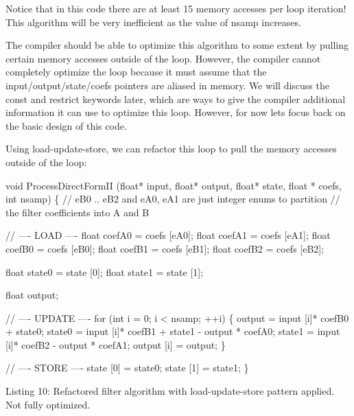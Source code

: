 Notice that in this code there are at least 15 memory accesses per loop iteration! This algorithm will be very inefficient as the value of {\ttfamily nsamp} increases.

The compiler should be able to optimize this algorithm to some extent by pulling certain memory accesses outside of the loop. However, the compiler cannot completely optimize the loop because it must assume that the input/output/state/coefs pointers are aliased in memory. We will discuss the {\ttfamily const} and {\ttfamily restrict} keywords later, which are ways to give the compiler additional information it can use to optimize this loop. However, for now let\textquotesingle{}s focus back on the basic design of this code.

Using load-\/update-\/store, we can refactor this loop to pull the memory accesses outside of the loop\+:


\begin{DoxyCode}
\textcolor{keywordtype}{void}
ProcessDirectFormII (\textcolor{keywordtype}{float}* input, \textcolor{keywordtype}{float}* output, \textcolor{keywordtype}{float}* state, \textcolor{keywordtype}{float} *
    coefs, \textcolor{keywordtype}{int} nsamp)
\{
    \textcolor{comment}{// eB0 .. eB2 and eA0, eA1 are just integer enums to partition}
    \textcolor{comment}{// the filter coefficients into A and B}

    \textcolor{comment}{// ---- LOAD ----}
    \textcolor{keywordtype}{float} coefA0 = coefs [eA0];
    \textcolor{keywordtype}{float} coefA1 = coefs [eA1];
    \textcolor{keywordtype}{float} coefB0 = coefs [eB0];
    \textcolor{keywordtype}{float} coefB1 = coefs [eB1];
    \textcolor{keywordtype}{float} coefB2 = coefs [eB2];

    \textcolor{keywordtype}{float} state0 = state [0];
    \textcolor{keywordtype}{float} state1 = state [1];

    \textcolor{keywordtype}{float} output;

    \textcolor{comment}{// ---- UPDATE ----}
    \textcolor{keywordflow}{for} (\textcolor{keywordtype}{int} i = 0; i < nsamp; ++i)
    \{
        output = input [i]* coefB0 + state0;
        state0 = input [i]* coefB1 + state1 - output * coefA0;
        state1 = input [i]* coefB2 - output * coefA1;
        output [i] = output;
    \}

    \textcolor{comment}{// ---- STORE ----}
    state [0] = state0;
    state [1] = state1;
\} 
\end{DoxyCode}
  Listing 10\+: Refactored filter algorithm with load-\/update-\/store pattern applied. Not fully optimized.

